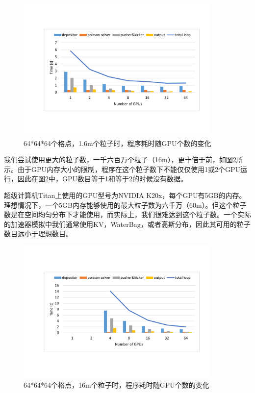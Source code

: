 \begin{figure}[!htb]
  \centering
  \includegraphics[width=0.9\textwidth]{Img/PIC_speedup_Titan_1_6m.pdf}
  \caption{64*64*64个格点，1.6m个粒子时，程序耗时随GPU个数的变化}
  \label{fig:PIC_speedup_Titan_1_6m}
\end{figure}

我们尝试使用更大的粒子数，一千六百万个粒子（16m），更十倍于前，如图\ref{fig:PIC_speedup_Titan_16m}所示。由于GPU内存大小的限制，程序在这个粒子数下不能仅仅使用1或2个GPU运行，因此在图\ref{fig:PIC_speedup_Titan_16m}中，GPU数目等于1和等于2的时候没有数据。

超级计算机Titan上使用的GPU型号为NVIDIA K20x，每个GPU有5GB的内存。理想情况下，一个5GB内存能够使用的最大粒子数为六千万（60m）。但这个粒子数是在空间均匀分布下才能使用，而实际上，我们很难达到这个粒子数。一个实际的加速器模拟中我们通常使用KV，WaterBag，或者高斯分布，因此其可用的粒子数目远小于理想数目。

\begin{figure}[!htb]
  \centering
  \includegraphics[width=0.9\textwidth]{Img/PIC_speedup_Titan_16m.pdf}
  \caption{64*64*64个格点，16m个粒子时，程序耗时随GPU个数的变化}
  \label{fig:PIC_speedup_Titan_16m}
\end{figure}

